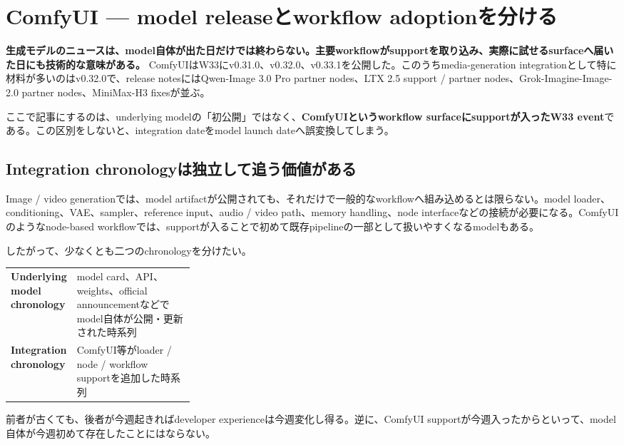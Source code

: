 \section{ComfyUI --- model releaseとworkflow adoptionを分ける}
\label{sec:comfyui}

\textbf{生成モデルのニュースは、model自体が出た日だけでは終わらない。主要workflowがsupportを取り込み、実際に試せるsurfaceへ届いた日にも技術的な意味がある。}
ComfyUIはW33にv0.31.0、v0.32.0、v0.33.1を公開した\cite{comfyui-0310,comfyui-0320,comfyui-0331}。このうちmedia-generation integrationとして特に材料が多いのはv0.32.0で、release notesにはQwen-Image 3.0 Pro partner nodes、LTX 2.5 support / partner nodes、Grok-Imagine-Image-2.0 partner nodes、MiniMax-H3 fixesが並ぶ\cite{comfyui-0320}。

ここで記事にするのは、underlying modelの「初公開」ではなく、\textbf{ComfyUIというworkflow surfaceにsupportが入ったW33 event}である。この区別をしないと、integration dateをmodel launch dateへ誤変換してしまう。

\subsection*{Integration chronologyは独立して追う価値がある}

Image / video generationでは、model artifactが公開されても、それだけで一般的なworkflowへ組み込めるとは限らない。model loader、conditioning、VAE、sampler、reference input、audio / video path、memory handling、node interfaceなどの接続が必要になる。ComfyUIのようなnode-based workflowでは、supportが入ることで初めて既存pipelineの一部として扱いやすくなるmodelもある。

したがって、少なくとも二つのchronologyを分けたい。

\begin{center}
\small
\begin{tabularx}{0.96\linewidth}{@{}>{\bfseries}p{0.30\linewidth}X@{}}
Underlying model chronology & model card、API、weights、official announcementなどでmodel自体が公開・更新された時系列 \\
Integration chronology & ComfyUI等がloader / node / workflow supportを追加した時系列 \\
\end{tabularx}
\end{center}

前者が古くても、後者が今週起きればdeveloper experienceは今週変化し得る。逆に、ComfyUI supportが今週入ったからといって、model自体が今週初めて存在したことにはならない。

